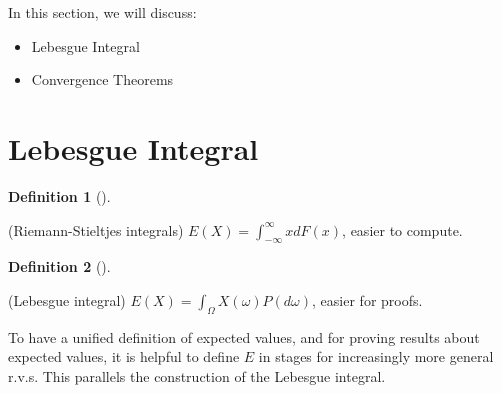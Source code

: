 \documentclass[
  letterpaper,
  DIV=11,
  numbers=noendperiod]{scrreprt}
\providecommand{\tightlist}{%
  \setlength{\itemsep}{0pt}\setlength{\parskip}{0pt}}\usepackage{longtable,booktabs,array}
\theoremstyle{plain}
\theoremstyle{definition}
\newtheorem{definition}{Definition}[chapter]
\theoremstyle{remark}
\begin{document}

In this section, we will discuss:

\begin{itemize}
\tightlist
\item
  Lebesgue Integral
\item
  Convergence Theorems
\end{itemize}

\hypertarget{lebesgue-integral}{%
\section*{Lebesgue Integral}\label{lebesgue-integral}}


\leavevmode{}%
\begin{definition}[]\label{def-Riemann-Stieltjes-integral}

(Riemann-Stieltjes integrals)
\(E(X) = \int_{-\infty}^{\infty} x dF(x)\), easier to compute.

\end{definition}

\leavevmode{}%
\begin{definition}[]\label{def-Lebesgue-integral}

(Lebesgue integral) \(E(X) = \int_{\Omega} X(\omega) P(d\omega)\),
easier for proofs.

\end{definition}

To have a unified definition of expected values, and for proving results
about expected values, it is helpful to define \(E\) in stages for
increasingly more general r.v.s. This parallels the construction of the
Lebesgue integral.
\end{document}
